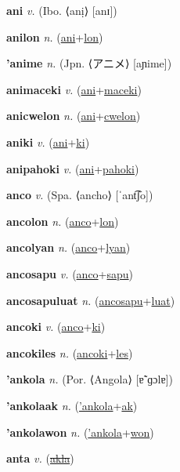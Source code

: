 \textbf{\hypertarget{ani}{ani}} \textit{v.} (Ibo. ⟨anị⟩ [anɪ])


\textbf{\hypertarget{anilon}{anilon}} \textit{n.} (\hyperlink{ani}{ani}+\allowbreak \hyperlink{lon}{lon})


\textbf{\hypertarget{'anime}{'anime}} \textit{n.} (Jpn. ⟨{\japanese{}アニメ}⟩ [aɲime])


\textbf{\hypertarget{animaceki}{animaceki}} \textit{v.} (\hyperlink{ani}{ani}+\allowbreak \hyperlink{maceki}{maceki})


\textbf{\hypertarget{anicwelon}{anicwelon}} \textit{n.} (\hyperlink{ani}{ani}+\allowbreak \hyperlink{cwelon}{cwelon})


\textbf{\hypertarget{aniki}{aniki}} \textit{v.} (\hyperlink{ani}{ani}+\allowbreak \hyperlink{ki}{ki})


\textbf{\hypertarget{anipahoki}{anipahoki}} \textit{v.} (\hyperlink{ani}{ani}+\allowbreak \hyperlink{pahoki}{pahoki})


\textbf{\hypertarget{anco}{anco}} \textit{v.} (Spa. ⟨ancho⟩ [ˈant͡ʃo])


\textbf{\hypertarget{ancolon}{ancolon}} \textit{n.} (\hyperlink{anco}{anco}+\allowbreak \hyperlink{lon}{lon})


\textbf{\hypertarget{ancolyan}{ancolyan}} \textit{n.} (\hyperlink{anco}{anco}+\allowbreak \hyperlink{lyan}{lyan})


\textbf{\hypertarget{ancosapu}{ancosapu}} \textit{v.} (\hyperlink{anco}{anco}+\allowbreak \hyperlink{sapu}{sapu})


\textbf{\hypertarget{ancosapuluat}{ancosapuluat}} \textit{n.} (\hyperlink{ancosapu}{ancosapu}+\allowbreak \hyperlink{luat}{luat})


\textbf{\hypertarget{ancoki}{ancoki}} \textit{v.} (\hyperlink{anco}{anco}+\allowbreak \hyperlink{ki}{ki})


\textbf{\hypertarget{ancokiles}{ancokiles}} \textit{n.} (\hyperlink{ancoki}{ancoki}+\allowbreak \hyperlink{les}{les})


\textbf{\hypertarget{'ankola}{'ankola}} \textit{n.} (Por. ⟨Angola⟩ [ɐ̃ˈɡɔlɐ])


\textbf{\hypertarget{'ankolaak}{'ankolaak}} \textit{n.} (\hyperlink{'ankola}{'ankola}+\allowbreak \hyperlink{ak}{ak})


\textbf{\hypertarget{'ankolawon}{'ankolawon}} \textit{n.} (\hyperlink{'ankola}{'ankola}+\allowbreak \hyperlink{won}{won})


\textbf{\hypertarget{anta}{anta}} \textit{v.} (\hyperlink{akla}{\sout{akla}})



